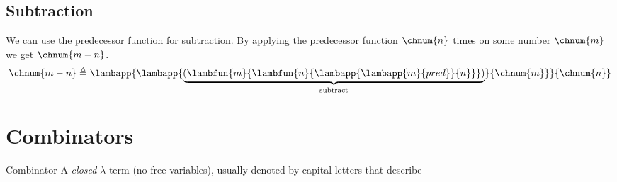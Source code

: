 \subsection{Subtraction}
We can use the predecessor function for subtraction. By applying the predecessor function $\chnum{n}$ times on some number $\chnum{m}$ we get $\chnum{m - n}$.
\[\chnum{m - n} \triangleq \lambapp{\lambapp{\underbrace{(\lambfun{m}{\lambfun{n}{\lambapp{\lambapp{m}{pred}}{n}}})}_\text{subtract}}{\chnum{m}}}{\chnum{n}}\]

\section{Combinators}
\begin{definitionbox}{Combinator}
	A \textit{closed} $\lambda$-term (no free variables), usually denoted by capital letters that describe
\end{definitionbox}
